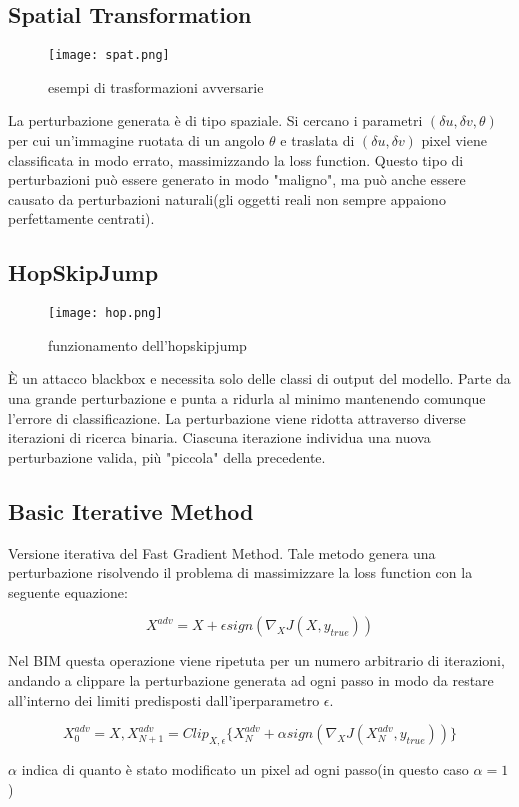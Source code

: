 \subsection{Spatial Transformation}
\begin{figure}[h]
    \texttt{[image: spat.png]}
    \caption{esempi di trasformazioni avversarie}
    \label{fig:spat}
\end{figure}
\cite{spatial}La perturbazione generata è di tipo spaziale. Si cercano i parametri $(\delta u,\delta v,\theta)$ per cui un'immagine ruotata di un angolo $\theta$ e traslata di 
$(\delta u, \delta v)$ pixel viene classificata in modo errato, massimizzando la loss function. Questo tipo di perturbazioni può essere generato in modo "maligno", ma può anche essere causato da perturbazioni naturali(gli oggetti reali
non sempre appaiono perfettamente centrati).
\subsection{HopSkipJump}
\begin{figure}[h]
    \texttt{[image: hop.png]}
    \caption{funzionamento dell'hopskipjump}
    \label{fig:hop}
\end{figure}
È un attacco blackbox e necessita solo delle classi di output del modello. Parte da una grande perturbazione e punta a ridurla al minimo mantenendo comunque l'errore di classificazione.
La perturbazione viene ridotta attraverso diverse iterazioni di ricerca binaria. Ciascuna iterazione individua una nuova perturbazione valida, più "piccola" della precedente.
\subsection{Basic Iterative Method}
\cite{bim}Versione iterativa del Fast Gradient Method. Tale metodo genera una perturbazione risolvendo il problema di massimizzare la loss function con la seguente equazione:

\[X^{adv} = X + \epsilon sign(\nabla _{X}J(X,y_{true}))\]

Nel BIM  questa operazione viene ripetuta per un numero arbitrario di iterazioni, andando a clippare la perturbazione generata ad ogni passo  in modo da restare
all'interno dei limiti predisposti dall'iperparametro $\epsilon$.

\[X^{adv}_{0} = X, X^{adv}_{N+1} = Clip_{X,\epsilon}\{ X^{adv}_{N} + \alpha sign(\nabla _{X}J(X^{adv}_{N},y_{true})) \}\]

$\alpha$ indica di quanto è stato modificato un pixel ad ogni passo(in questo caso $\alpha=1$)
